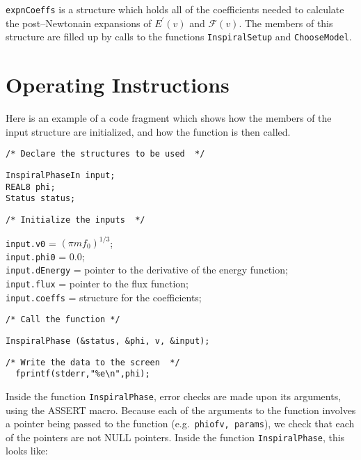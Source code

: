 \documentclass[12pt]{article}
\begin{document}
\texttt{expnCoeffs} is a structure which holds all of the coefficients needed to calculate the post--Newtonain expansions of $E^{\prime}(v)$ and $\mathcal{F}(v)$. The members of this structure are filled up by calls to the functions \texttt{InspiralSetup} and \texttt{ChooseModel}.









\section{Operating Instructions}

Here is an example of a code fragment which shows how the members of the input structure are initialized, and how the function is then called.

\vspace{5mm}

\noindent
\begin{verbatim}
/* Declare the structures to be used  */
\end{verbatim}
\texttt{InspiralPhaseIn input;} \\
\texttt{REAL8 phi;} \\
\texttt{Status status;} \\
\begin{verbatim}
/* Initialize the inputs  */
\end{verbatim}
\texttt{input.v0} = $(\pi m f_{0})^{1/3}$; \\
\texttt{input.phi0} = 0.0; \\
\texttt{input.dEnergy} = pointer to the derivative of the energy function; \\
\texttt{input.flux} = pointer to the flux function; \\
\texttt{input.coeffs} = structure for the coefficients; \\
\begin{verbatim}
/* Call the function */
\end{verbatim}
\texttt{InspiralPhase (\&status, \&phi, v,  \&input);}
\begin{verbatim}
/* Write the data to the screen  */
  fprintf(stderr,"%e\n",phi); 
\end{verbatim}

Inside the function \texttt{InspiralPhase}, error checks are made upon its arguments, using the ASSERT macro. Because each of the arguments to the function involves a pointer being passed to the function (e.g.\ \texttt{phiofv, params}), we check that each of the pointers are not NULL pointers.
Inside the function \texttt{InspiralPhase}, this looks like:
\end{document}
